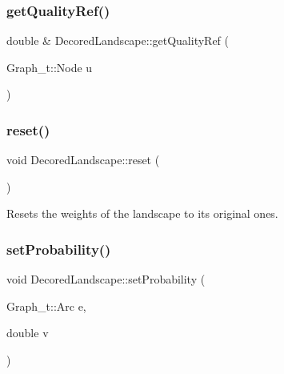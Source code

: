 \mbox{\label{class_decored_landscape_a2c6557a008e3b8a6d93bf307a71a1b33}} 
\subsubsection{\texorpdfstring{get\+Quality\+Ref()}{getQualityRef()}}
{\footnotesize\ttfamily double \& Decored\+Landscape\+::get\+Quality\+Ref (\begin{DoxyParamCaption}\item[{Graph\+\_\+t\+::\+Node}]{u }\end{DoxyParamCaption})}

\mbox{\label{class_decored_landscape_a9acf573f999cbf3e96fb567a89d02a1b}} 
\subsubsection{\texorpdfstring{reset()}{reset()}}
{\footnotesize\ttfamily void Decored\+Landscape\+::reset (\begin{DoxyParamCaption}{ }\end{DoxyParamCaption})}



Resets the weights of the landscape to its original ones. 

\mbox{\label{class_decored_landscape_a53063f0f592b1cd00c3456fd40722c53}} 
\subsubsection{\texorpdfstring{set\+Probability()}{setProbability()}}
{\footnotesize\ttfamily void Decored\+Landscape\+::set\+Probability (\begin{DoxyParamCaption}\item[{Graph\+\_\+t\+::\+Arc}]{e,  }\item[{double}]{v }\end{DoxyParamCaption})}


